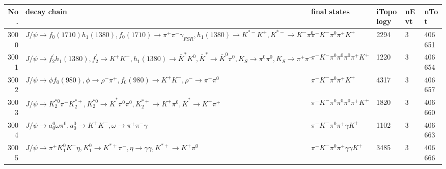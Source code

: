 \begin{table}[htbp] 
\begin{center}
\begin{small}
\begin{tabular}{rlllll}\hline\hline
 No. & decay chain & final states &  iTopology & nEvt & nTot \\\hline
3000&$J/\psi       \rightarrow f_{0}(1710)    h_{1}(1380)    , f_{0}(1710)     \rightarrow \pi^{+}        \pi^{-}        \gamma_{FSR} , h_{1}(1380)     \rightarrow K^{*-}         K^{+}          , K^{*-}          \rightarrow K^{-}          \pi^{0}        $&$\pi^{-}        K^{-}          \pi^{0}        \pi^{+}        K^{+}          $& 2294&    3&406651\\
3001&$J/\psi       \rightarrow f_2^{'}       h_{1}(1380)    , f_2^{'}        \rightarrow K^{+}          K^{-}          , h_{1}(1380)     \rightarrow \bar{K}^{*}   K^{0}          , \bar{K}^{*}    \rightarrow \bar{K}^{0}   \pi^{0}        , K_{S}           \rightarrow \pi^{0}        \pi^{0}        , K_{S}           \rightarrow \pi^{+}        \pi^{-}        $&$\pi^{-}        K^{-}          \pi^{0}        \pi^{0}        \pi^{0}        \pi^{+}        K^{+}          $& 1220&    3&406654\\
3002&$J/\psi       \rightarrow \phi           f_{0}(980)     , \phi            \rightarrow \rho^{-}      \pi^{+}        , f_{0}(980)      \rightarrow K^{+}          K^{-}          , \rho^{-}       \rightarrow \pi^{-}        \pi^{0}        $&$\pi^{-}        K^{-}          \pi^{0}        \pi^{+}        K^{+}          $& 4317&    3&406657\\
3003&$J/\psi       \rightarrow K_2^{*0}       \pi^{-}        K_2^{*+}       , K_2^{*0}        \rightarrow \bar{K}^{*}   \pi^{0}        \pi^{0}        , K_2^{*+}        \rightarrow K^{+}          \pi^{0}        , \bar{K}^{*}    \rightarrow K^{-}          \pi^{+}        $&$\pi^{-}        K^{-}          \pi^{0}        \pi^{0}        \pi^{0}        \pi^{+}        K^{+}          $& 1820&    3&406660\\
3004&$J/\psi       \rightarrow a_{0}^{0}      \omega         \pi^{0}        , a_{0}^{0}       \rightarrow K^{+}          K^{-}          , \omega          \rightarrow \pi^{+}        \pi^{-}        \gamma       $&$\pi^{-}        K^{-}          \pi^{0}        \pi^{+}        \gamma       K^{+}          $& 1102&    3&406663\\
3005&$J/\psi       \rightarrow \pi^{+}        K_1^{0}        K^{-}          \eta          , K_1^{0}         \rightarrow K^{*+}         \pi^{-}        , \eta           \rightarrow \gamma       \gamma       , K^{*+}          \rightarrow K^{+}          \pi^{0}        $&$\pi^{-}        K^{-}          \pi^{0}        \pi^{+}        \gamma       \gamma       K^{+}          $& 3485&    3&406666\\

\end{tabular}
\end{small}
\end{center}
\end{table}
